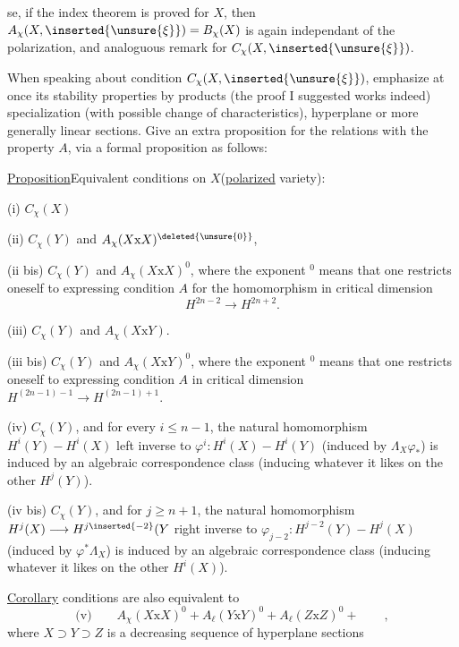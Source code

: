 se, if the index theorem is proved for $X$, then $A_{\chi}(X,\inserted{\unsure{\xi}})=B_{\chi}(X)$ is again independant of the polarization, and analoguous remark for $C_{\chi}(X,\inserted{\unsure{\xi}})$.

When speaking about condition $C_{\chi}(X,\inserted{\unsure{\xi}})$, emphasize at once its stability properties by products (the proof I suggested works indeed) specialization (with possible change of characteristics), hyperplane or more generally linear sections. Give an extra proposition for the relations with the property $A$, via a formal proposition as follows:

\uline{Proposition}\quad Equivalent conditions on $X$(\uline{polarized} variety):

(i) $C_{\chi}(X)$

(ii) $C_{\chi}(Y)$ and $A_{\chi}(X\mathrm{x}X)^{\deleted{\unsure{0}}}$, 

(ii bis) $C_{\chi}(Y)$ and $A_{\chi}(X\mathrm{x}X)^0$, where the exponent $^0$ means that one restricts oneself to expressing condition $A$ for the homomorphism in critical dimension
\[
H^{2n-2}\longrightarrow H^{2n+2}.
\]

(iii) $C_{\chi}(Y)$ and $A_{\chi}(X\mathrm{x}Y)$.

(iii bis) $C_{\chi}(Y)$ and $A_{\chi}(X\mathrm{x}Y)^0$, where the exponent $^0$ means that one restricts oneself to expressing condition $A$ in critical dimension $H^{(2n-1)-1}\longrightarrow H^{(2n-1)+1}$.

(iv)  $C_{\chi}(Y)$, and for every $i\leq n-1$, the natural homomorphism $H^i(Y)\mathbin{-}H^i(X)$ left inverse to $\varphi^i:H^i(X)\mathbin{-}H^i(Y)$ (induced by $\Lambda_X\varphi_{*}$) is induced by an algebraic correspondence class (inducing whatever it likes on the other $H^j(Y)$).

(iv bis) $C_{\chi}(Y)$, and for $j\geq n+1$, the natural homomorphism $H^j(X)\longrightarrow H^{j\inserted{-2}}(Y$ right inverse to $\varphi_{j-2}:H^{j-2}(Y)\mathbin{-}H^j(X)$  (induced by $\varphi^*\Lambda_X$) is induced by an algebraic correspondence class (inducing whatever it likes on the other $H^i(X)$).

\uline{Corollary}\quad {} conditions are also equivalent to
\[
\text{(v)}\qquad A_{\chi}(X\mathrm{x}X)^0+A_{\ell}(Y\mathrm{x}Y)^0+A_{\ell}(Z\mathrm{x}Z)^0+\qquad,
\]
where $X\supset Y\supset Z$ is a decreasing sequence of  hyperplane sections
